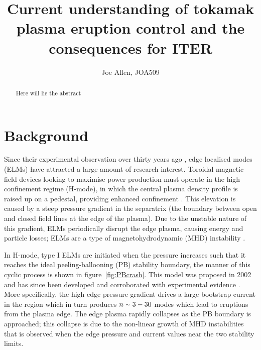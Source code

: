 \documentclass[11pt, twocolumn]{article}  %
\providecommand{\squiggle}{\raise.17ex\hbox{$\scriptstyle\sim$}} %
\begin{document}
\title{Current understanding of tokamak plasma eruption control and the consequences for ITER}
\author{Joe Allen, JOA509}
\maketitle

\begin{abstract}
Here will lie the abstract
\end{abstract}

\tableofcontents

\section{Background}\label{sec:Bg}
Since their experimental observation over thirty years ago \cite{Keilhacker1984}, edge localised modes (ELMs) have attracted a large amount of research interest. Toroidal magnetic field devices looking to maximise power production must operate in the high confinement regime (H-mode), in which the central plasma density profile is raised up on a pedestal, providing enhanced confinement \cite{Wagner2007}. This elevation is caused by a steep pressure gradient in the separatrix (the boundary between open and closed field lines at the edge of the plasma). Due to the unstable nature of this gradient, ELMs periodically disrupt the edge plasma, causing energy and particle losses; ELMs are a type of magnetohydrodynamic (MHD) instability \cite{Zohm1996}.

In H-mode, type I ELMs are initiated when the pressure increases such that it reaches the ideal peeling-ballooning (PB) stability boundary, the manner of this cyclic process is shown in figure~\ref{fig:PBcrash}. This model was proposed in 2002 \cite{Snyder2002} and has since been developed and corroborated with experimental evidence \cite{Wilson2002}. More specifically, the high edge pressure gradient drives a large bootstrap current in the region which in turn produces $n~\squiggle~3-30$ modes \cite{Snyder2009} which lead to eruptions from the plasma edge. The edge plasma rapidly collapses as the PB boundary is approached; this collapse is due to the non-linear growth of MHD instabilities \cite{Wilson2004} that is observed when the edge pressure and current values near the two stability limits.
\end{document}
